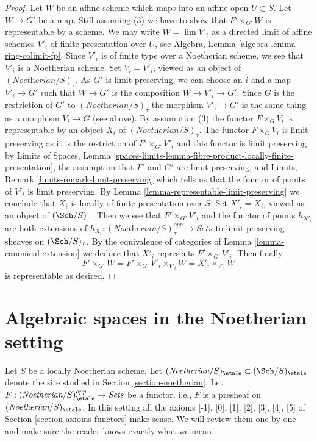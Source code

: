 \begin{proof}
\medskip\noindent
Let $W$ be an affine scheme which maps into an affine open $U \subset S$.
Let $W \to G'$ be a map.
Still assuming (3) we have to show that $F' \times_{G'} W$
is representable by a scheme.
We may write $W = \lim V'_i$ as a directed limit of affine
schemes $V'_i$ of finite presentation over $U$, see
Algebra, Lemma \ref{algebra-lemma-ring-colimit-fp}.
Since $V'_i$ is of finite type over a Noetherian scheme,
we see that $V'_i$ is a Noetherian scheme.
Set $V_i = V'_i$, viewed as an object of
$(\textit{Noetherian}/S)_\tau$. As $G'$
is limit preserving, we can choose an $i$ and a map
$V'_i \to G'$ such that $W \to G'$ is the composition
$W \to V'_i \to G'$. Since $G$ is the restriction of $G'$
to $(\textit{Noetherian}/S)_\tau$ the morphism $V'_i \to G'$
is the same thing as a morphism $V_i \to G$ (see above).
By assumption (3) the functor $F \times_G V_i$ is representable by an object
$X_i$ of $(\textit{Noetherian}/S)_\tau$.
The functor $F \times_G V_i$ is limit preserving
as it is the restriction of $F' \times_{G'} V'_i$
and this functor is limit preserving by
Limits of Spaces, Lemma
\ref{spaces-limits-lemma-fibre-product-locally-finite-presentation},
the assumption that $F'$ and $G'$ are limit preserving, and
Limits, Remark \ref{limits-remark-limit-preserving} which
tells us that the functor of points of $V'_i$ is limit preserving.
By Lemma \ref{lemma-representable-limit-preserving}
we conclude that $X_i$ is locally of finite presentation over $S$.
Set $X'_i = X_i$, viewed as an object of
$(\Sch/S)_\tau$. Then we see that $F' \times_{G'} V'_i$
and the functor of points $h_{X'_i}$ are both extensions
of $h_{X_i} : (\textit{Noetherian}/S)_\tau^{opp} \to \textit{Sets}$
to limit preserving sheaves on $(\Sch/S)_\tau$.
By the equivalence of categories of Lemma \ref{lemma-canonical-extension}
we deduce that $X'_i$ represents $F' \times_{G'} V'_i$.
Then finally
$$
F' \times_{G'} W = F' \times_{G'} V'_i \times_{V'_i} W =
X'_i \times_{V'_i} W
$$
is representable as desired.
\end{proof}






\section{Algebraic spaces in the Noetherian setting}
\label{section-algebraic-spaces-noetherian}

\noindent
Let $S$ be a locally Noetherian scheme. Let
$(\textit{Noetherian}/S)_\etale \subset (\Sch/S)_\etale$
denote the site studied in Section \ref{section-noetherian}.
Let $F : (\textit{Noetherian}/S)_\etale^{opp} \to \textit{Sets}$
be a functor, i.e., $F$ is a presheaf on $(\textit{Noetherian}/S)_\etale$.
In this setting all the axioms [-1],  [0], [1], [2], [3], [4], [5] of
Section \ref{section-axioms-functors} make sense. We will review them
one by one and make sure the reader knows exactly what we mean.

